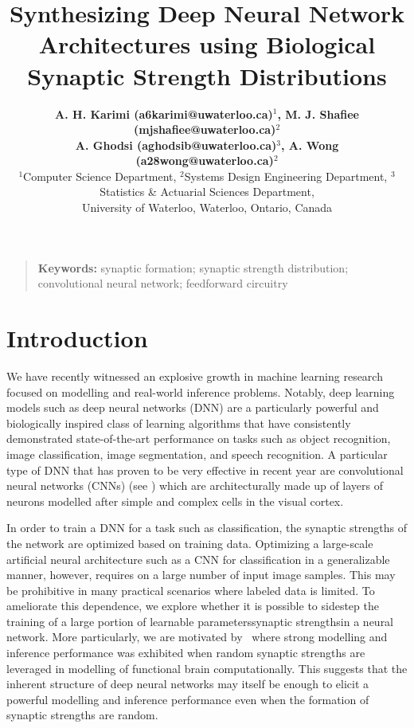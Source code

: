 \documentclass[10pt,letterpaper]{article}
\title{Synthesizing Deep Neural Network Architectures using Biological Synaptic Strength Distributions}
\author{{\large \bf A. H. Karimi (a6karimi@uwaterloo.ca)$^1$, \large \bf M. J. Shafiee (mjshafiee@uwaterloo.ca)$^2$ }\\
	 {\large \bf A. Ghodsi (aghodsib@uwaterloo.ca)$^3$, \large \bf A. Wong (a28wong@uwaterloo.ca)$^2$ } \\
  $^1$Computer Science Department, $^2$Systems Design Engineering Department, $^3$Statistics \& Actuarial Sciences Department, \\
  University of Waterloo, Waterloo, Ontario, Canada}
\begin{document}
\maketitle


\begin{quote}
\small
\textbf{Keywords:}
synaptic formation; synaptic strength distribution; convolutional neural network; feedforward circuitry %
\end{quote}

\section{Introduction}


We have recently witnessed an explosive growth in machine learning research focused on modelling and real-world inference problems. Notably, deep learning models such as deep neural networks (DNN) are a particularly powerful and biologically inspired class of learning algorithms that have consistently demonstrated state-of-the-art performance on tasks such as object recognition, image classification, image segmentation, and speech recognition. A particular type of DNN that has proven to be very effective in recent year are convolutional neural networks (CNNs) (see \cite{hubel1968receptive}) which are architecturally made up of layers of neurons modelled after simple and complex cells in the visual cortex.




In order to train a DNN for a task such as classification, the synaptic strengths of the network are optimized based on training data. Optimizing a large-scale artificial neural architecture such as a CNN for classification in a generalizable manner, however, requires on a large number of input image samples. This may be prohibitive in many practical scenarios where labeled data is limited. To ameliorate this dependence, we explore whether it is possible to sidestep the training of a large portion of learnable parameters\textemdash synaptic strengths\textemdash in a neural network. More particularly, we are motivated by~\cite{eliasmith2012large} where strong modelling and inference performance was exhibited when random synaptic strengths are leveraged in modelling of functional brain computationally. This suggests that the inherent structure of deep neural networks may itself be enough to elicit a powerful modelling and inference performance even when the formation of synaptic strengths are random.
\end{document}
